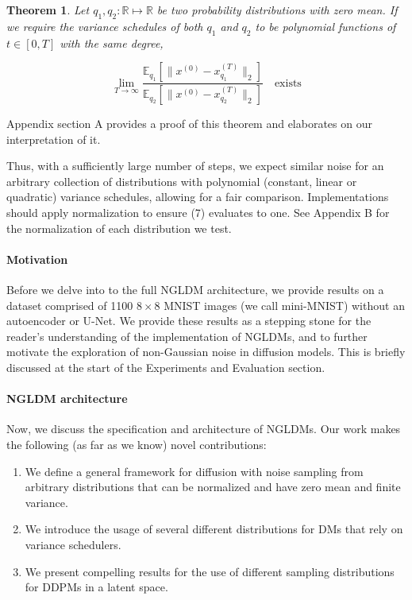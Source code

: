 \documentclass[10pt,twocolumn,letterpaper]{article}
\newtheorem{theorem}{Theorem}
\newcommand\norm[1]{\lVert#1\rVert}
\begin{document}
\begin{theorem}
    Let $q_1,q_2:\mathbb{R}\mapsto \mathbb{R}$ be two probability distributions with zero mean. If we require the variance schedules of both $q_1$ and $q_2$ to be polynomial functions of $t\in [0,T]$ with the same degree,

    \begin{equation}
        \lim_{T\to \infty}\frac{\mathbb{E}_{q_1}[\norm{x^{(0)}-x^{(T)}_{q_1}}_2]}{\mathbb{E}_{q_2}[\norm{x^{(0)}-x^{(T)}_{q_2}}_2]}\quad\text{exists}
    \end{equation}
\end{theorem}

Appendix section A provides a proof of this theorem and elaborates on our interpretation of it.

Thus, with a sufficiently large number of steps, we expect similar noise for an arbitrary collection of distributions with polynomial (constant, linear or quadratic) variance schedules, allowing for a fair comparison. Implementations should apply normalization to ensure (7) evaluates to one. See Appendix B for the normalization of each distribution we test.

\paragraph{\textbf{Motivation}} Before we delve into to the full NGLDM architecture, we provide results on a dataset comprised of 1100 $8\times 8$ MNIST images (we call mini-MNIST) without an autoencoder or U-Net. We provide these results as a stepping stone for the reader's understanding of the implementation of NGLDMs, and to further motivate the exploration of non-Gaussian noise in diffusion models. This is briefly discussed at the start of the Experiments and Evaluation section.

\paragraph{\textbf{NGLDM architecture}} Now, we discuss the specification and architecture of NGLDMs. Our work makes the following (as far as we know) novel contributions:
\begin{enumerate}[itemsep=1pt, parsep=1pt]
  \item We define a general framework for diffusion with noise sampling from arbitrary distributions that can be normalized and have zero mean and finite variance.
  \item We introduce the usage of several different distributions for DMs that rely on variance schedulers.
  \item We present compelling results for the use of different sampling distributions for DDPMs in a latent space.
\end{enumerate}
\end{document}

